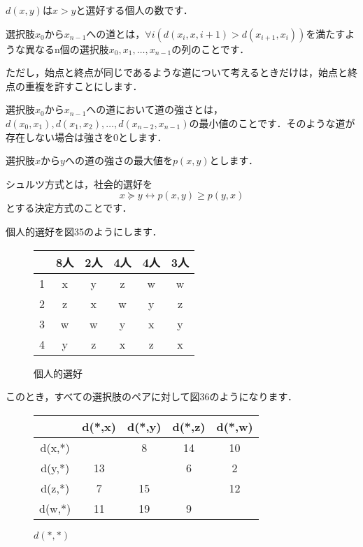 \begin{dfn}
    $d(x,y)$は$x>y$と選好する個人の数です．    
\end{dfn}
\begin{dfn}[道]
    選択肢$x_0$から$x_{n-1}$への道とは，$\forall i (d(x_i,x,{i+1}) > d(x_{i+1},x_i))$を満たすような異なるn個の選択肢$x_0,x_1,\dots,x_{n-1}$の列のことです．
\end{dfn}
ただし，始点と終点が同じであるような道について考えるときだけは，始点と終点の重複を許すことにします．
\begin{dfn}[道の強さ]
    選択肢$x_0$から$x_{n-1}$への道において道の強さとは，\\$d(x_0,x_1),d(x_1,x_2),\dots,d(x_{n-2},x_{n-1})$の最小値のことです．そのような道が存在しない場合は強さを0とします．
\end{dfn}
\begin{dfn}
    選択肢$x$から$y$への道の強さの最大値を$p(x,y)$とします．
\end{dfn}
\begin{dfn}[シュルツ方式]
    シュルツ方式とは，社会的選好を
    \begin{equation*}
        x \succeq y \leftrightarrow p(x,y) \geq p(y,x)
    \end{equation*}
    とする決定方式のことです．
\end{dfn}

個人的選好を図35のようにします．
\begin{figure}[!h]
    \centering
    \begin{tabular}[!h]{|c|c|c|c|c|c|} \hline
          & 8人 & 2人 & 4人 & 4人 & 3人 \\ \hline
        1 & x   & y   & z   & w   & w   \\ \hline
        2 & z   & x   & w   & y   & z   \\ \hline
        3 & w   & w   & y   & x   & y   \\ \hline
        4 & y   & z   & x   & z   & x   \\ \hline
    \end{tabular}
    \caption{個人的選好}
\end{figure}
このとき，すべての選択肢のペアに対して図36のようになります．
\begin{figure}[!h]
    \centering
    \begin{tabular}[!h]{|c|c|c|c|c|} \hline
               & d(*,x) & d(*,y) & d(*,z) & d(*,w) \\ \hline
        d(x,*) &        &  8     & 14     & 10     \\ \hline
        d(y,*) & 13     &        &  6     &  2     \\ \hline
        d(z,*) &  7     & 15     &        & 12     \\ \hline
        d(w,*) & 11     & 19     &  9     &        \\ \hline
    \end{tabular}
    \caption{$d(*,*)$}
\end{figure}

